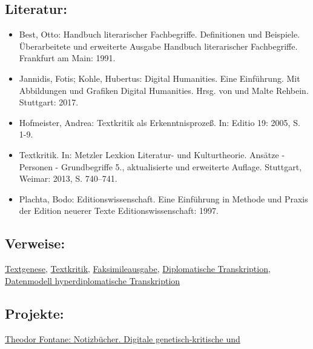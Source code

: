 \documentclass{article}
\begin{document}
        \subsection*{Literatur:}\begin{itemize}\item Best, Otto: Handbuch literarischer Fachbegriffe. Definitionen und
                              Beispiele. Überarbeitete und erweiterte Ausgabe Handbuch literarischer Fachbegriffe. Frankfurt am Main: 1991.\item Jannidis, Fotis; Kohle, Hubertus: Digital Humanities. Eine Einführung. Mit Abbildungen und
                              Grafiken Digital Humanities. Hrsg. von  und Malte Rehbein. Stuttgart: 2017.\item Hofmeister, Andrea: Textkritik als Erkenntnisprozeß. In: Editio 19: 2005, S. 1-9.\item Textkritik. In: Metzler Lexkion Literatur- und Kulturtheorie. Ansätze -
                              Personen - Grundbegriffe 5., aktualisierte und erweiterte
                                 Auflage. Stuttgart, Weimar: 2013, S. 740–741.\item Plachta, Bodo: Editionswissenschaft. Eine Einführung in Methode und
                              Praxis der Edition neuerer Texte Editionswissenschaft: 1997.\end{itemize}\subsection*{Verweise:}\href{https://gams.uni-graz.at/o:konde.28}{Textgenese}, \href{https://gams.uni-graz.at/o:konde.192}{Textkritik}, \href{https://gams.uni-graz.at/o:konde.83}{Faksimileausgabe}, \href{https://gams.uni-graz.at/o:konde.66}{Diplomatische Transkription}, \href{https://gams.uni-graz.at/o:konde.50}{Datenmodell hyperdiplomatische
                           Transkription}\subsection*{Projekte:}\href{https://fontane-nb.dariah.eu/index.html}{Theodor Fontane: Notizbücher. Digitale genetisch-kritische und
}
\end{document}
